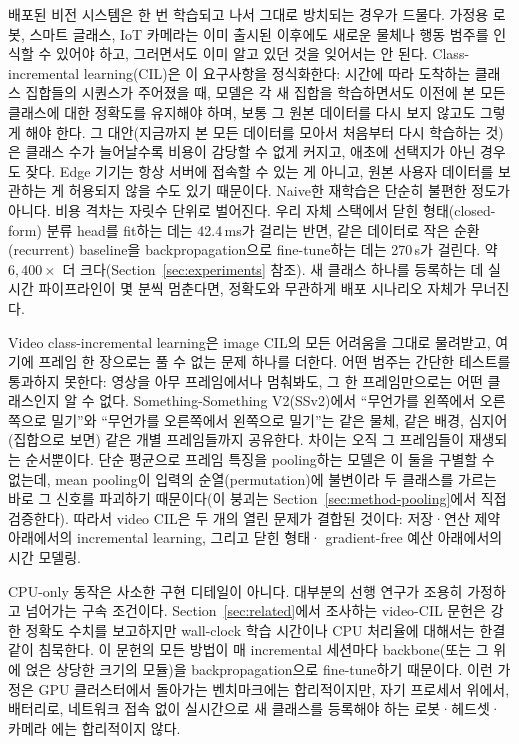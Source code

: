 \documentclass[11pt]{article}
\begin{document}
배포된 비전 시스템은 한 번 학습되고 나서 그대로 방치되는 경우가 드물다. 가정용
로봇, 스마트 글래스, IoT 카메라는 이미 출시된 이후에도 새로운 물체나 행동
범주를 인식할 수 있어야 하고, 그러면서도 이미 알고 있던 것을 잊어서는 안
된다. Class-incremental learning(CIL)은 이 요구사항을 정식화한다: 시간에
따라 도착하는 클래스 집합들의 시퀀스가 주어졌을 때, 모델은 각 새 집합을
학습하면서도 이전에 본 모든 클래스에 대한 정확도를 유지해야 하며, 보통 그
원본 데이터를 다시 보지 않고도 그렇게 해야 한다. 그 대안(지금까지 본 모든
데이터를 모아서 처음부터 다시 학습하는 것)은 클래스 수가 늘어날수록 비용이
감당할 수 없게 커지고, 애초에 선택지가 아닌 경우도 잦다. Edge 기기는 항상
서버에 접속할 수 있는 게 아니고, 원본 사용자 데이터를 보관하는 게 허용되지
않을 수도 있기 때문이다. Naive한 재학습은 단순히 불편한 정도가 아니다. 비용
격차는 자릿수 단위로 벌어진다. 우리 자체 스택에서 닫힌 형태(closed-form)
분류 head를 fit하는 데는 42.4\,ms가 걸리는 반면, 같은 데이터로 작은 순환
(recurrent) baseline을 backpropagation으로 fine-tune하는 데는 270\,s가
걸린다. 약 $6{,}400\times$ 더 크다(Section~\ref{sec:experiments} 참조). 새 클래스
하나를 등록하는 데 실시간 파이프라인이 몇 분씩 멈춘다면, 정확도와 무관하게
배포 시나리오 자체가 무너진다.

Video class-incremental learning은 image CIL의 모든 어려움을 그대로
물려받고, 여기에 프레임 한 장으로는 풀 수 없는 문제 하나를 더한다. 어떤
범주는 간단한 테스트를 통과하지 못한다: 영상을 아무 프레임에서나 멈춰봐도,
그 한 프레임만으로는 어떤 클래스인지 알 수 없다. Something-Something
V2(SSv2)에서 ``무언가를 왼쪽에서 오른쪽으로 밀기''와 ``무언가를 오른쪽에서
왼쪽으로 밀기''는 같은 물체, 같은 배경, 심지어 (집합으로 보면) 같은 개별
프레임들까지 공유한다. 차이는 오직 그 프레임들이 재생되는 순서뿐이다.
단순 평균으로 프레임 특징을 pooling하는 모델은 이 둘을 구별할 수 없는데,
mean pooling이 입력의 순열(permutation)에 불변이라 두 클래스를 가르는
바로 그 신호를 파괴하기 때문이다(이 붕괴는 Section~\ref{sec:method-pooling}에서
직접 검증한다). 따라서 video CIL은 두 개의 열린 문제가 결합된 것이다:
저장·연산 제약 아래에서의 incremental learning, 그리고 닫힌 형태·
gradient-free 예산 아래에서의 시간 모델링.

CPU-only 동작은 사소한 구현 디테일이 아니다. 대부분의 선행 연구가 조용히
가정하고 넘어가는 구속 조건이다. Section~\ref{sec:related}에서 조사하는
video-CIL 문헌은 강한 정확도 수치를 보고하지만 wall-clock 학습 시간이나
CPU 처리율에 대해서는 한결같이 침묵한다. 이 문헌의 모든 방법이 매
incremental 세션마다 backbone(또는 그 위에 얹은 상당한 크기의 모듈)을
backpropagation으로 fine-tune하기 때문이다. 이런 가정은 GPU 클러스터에서
돌아가는 벤치마크에는 합리적이지만, 자기 프로세서 위에서, 배터리로,
네트워크 접속 없이 실시간으로 새 클래스를 등록해야 하는 로봇·헤드셋·카메라
에는 합리적이지 않다.
\end{document}
